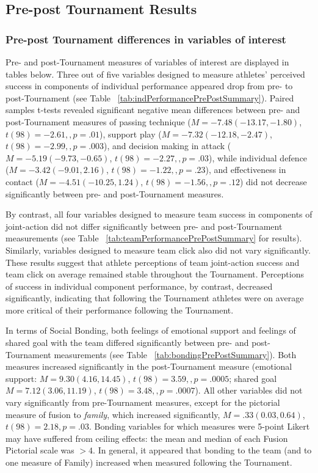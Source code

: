 \subsection{Pre-post Tournament Results}


\subsubsection{Pre-post Tournament differences in variables of interest}
Pre- and post-Tournament measures of variables of interest are displayed in tables below.  Three out of five variables designed to measure athletes' perceived success in components of individual performance appeared drop from pre- to post-Tournament (see Table ~\ref{tab:indPerformancePrePostSummary}).  Paired samples t-tests revealed significant negative mean differences between pre- and post-Tournament measures of passing technique ($M = -7.48 (-13.17, -1.80)$, $t(98)= -2.61,, p = .01$), support play ($M = -7.32 (-12.18, -2.47)$, $t(98)= -2.99,, p = .003$), and decision making in attack ($M = -5.19 ( -9.73, -0.65)$, $t(98)= -2.27,, p = .03$), while individual defence ($M = -3.42 (-9.01, 2.16)$, $t(98)= -1.22,, p = .23$), and effectiveness in contact ($M = -4.51 (-10.25, 1.24)$, $t(98)= -1.56,, p = .12$) did not decrease significantly between pre- and post-Tournament measures.

By contrast, all four variables designed to measure team success in components of joint-action did not differ significantly between pre- and post-Tournament measurements (see Table ~\ref{tab:teamPerformancePrePostSummary} for results).  Similarly, variables designed to measure team click also did not vary significantly.  These results suggest that athlete perceptions of team joint-action success and team click on average remained stable throughout the Tournament.  Perceptions of success in individual component performance, by contrast, decreased significantly, indicating that following the Tournament athletes were on average more critical of their performance following the Tournament.

In terms of Social Bonding, both feelings of emotional support and feelings of shared goal with the team differed significantly between pre- and post-Tournament measurements (see Table ~\ref{tab:bondingPrePostSummary}). Both measures increased significantly in the post-Tournament measure (emotional support: $M = 9.30 (4.16, 14.45)$, $t(98)= 3.59,, p = .0005$; shared goal $M = 7.12 (3.06, 11.19)$, $t(98)= 3.48,, p = .0007$).  All other variables did not vary significantly from pre-Tournament measures, except for the pictorial measure of fusion to \textit{family}, which increased significantly, $M = .33 (0.03, 0.64)$, $t(98)= 2.18, p = .03$.  Bonding variables for which measures were 5-point Likert may have suffered from ceiling effects: the mean and median of each Fusion Pictorial scale was $> 4$.  In general, it appeared that bonding to the team (and to one measure of Family) increased when measured following the Tournament.

